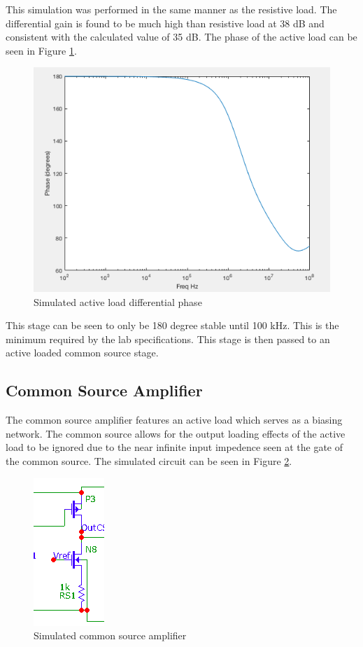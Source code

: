 This simulation was performed in the same manner as the resistive load. The differential gain is found to be much high than resistive load at 38 dB and consistent with the calculated value of 35 dB. The phase of the active load can be seen in Figure \ref{fig:activephase}.
\begin{figure}[H]
	\begin{center}
		\includegraphics[scale=.40]{Simulations/phase_secondstage.png}
		\caption{Simulated active load differential phase}
		\label{fig:activephase}
	\end{center}
\end{figure}
This stage can be seen to only be 180 degree stable until 100 kHz. This is the minimum required by the lab specifications. This stage is then passed to an active loaded common source stage.

\subsection{Common Source Amplifier}

The common source amplifier features an active load which serves as a biasing network. The common source allows for the output loading effects of the active load to be ignored due to the near infinite input impedence seen at the gate of the common source. The simulated circuit can be seen in Figure \ref{fig:simcs}.

\begin{figure}[H]
	\begin{center}
		\includegraphics[scale=.65]{Simulations/simcs.png}
		\caption{Simulated common source amplifier}
		\label{fig:simcs}
	\end{center}
\end{figure} 

